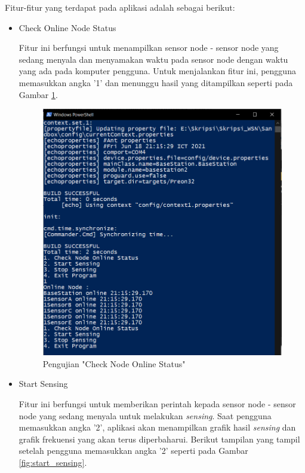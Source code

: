 Fitur-fitur yang terdapat pada aplikasi adalah sebagai berikut:
\begin{itemize}
    \item Check Online Node Status
    
    Fitur ini berfungsi untuk menampilkan sensor node - sensor node yang sedang menyala dan menyamakan waktu pada sensor node dengan waktu yang ada pada komputer pengguna. Untuk menjalankan fitur ini, pengguna memasukkan angka '1' dan menunggu hasil yang ditampilkan seperti pada Gambar \ref{fig:check_node}.
    
    \begin{figure}[H] 
    	\centering  
    	\includegraphics[scale=0.8]{Lampiran/HasilPengujian/fungsional1.PNG}
    	\caption[Pengujian "Check Node Online Status"]{Pengujian "Check Node Online Status"}
    	\label{fig:check_node} 
    \end{figure}
    
    \item Start Sensing
    
    Fitur ini berfungsi untuk memberikan perintah kepada sensor node - sensor node yang sedang menyala untuk melakukan \textit{sensing}. Saat pengguna memasukkan angka '2', aplikasi akan menampilkan grafik hasil \textit{sensing} dan grafik frekuensi yang akan terus diperbaharui. Berikut tampilan yang tampil setelah pengguna memasukkan angka '2' seperti pada Gambar \ref{fig:start_sensing}.
    

\end{itemize}
